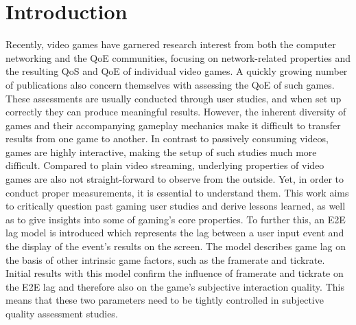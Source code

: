 \section{Introduction}
\label{sec:introduction}

Recently, video games have garnered research interest from both the computer networking and the \gls{QoE} communities, focusing on network-related properties and the resulting \gls{QoS} and \gls{QoE} of individual video games. 
A quickly growing number of publications also concern themselves with assessing the \gls{QoE} of such games. These assessments are usually conducted through user studies, and when set up correctly they can produce meaningful results. However, the inherent diversity of games and their accompanying gameplay mechanics make it difficult to transfer results from one game to another. In contrast to passively consuming videos, games are highly interactive, making the setup of such studies much more difficult. Compared to plain video streaming, underlying properties of video games are also not straight-forward to observe from the outside. Yet, in order to conduct proper measurements, it is essential to understand them. This work aims to critically question past gaming user studies and derive lessons learned, as well as to give insights into some of gaming's core properties. To further this, an \gls{E2E} lag model is introduced which represents the lag between a user input event and the display of the event's results on the screen. The model describes game lag on the basis of other intrinsic game factors, such as the framerate and tickrate. Initial results with this model confirm the influence of framerate and tickrate on the \gls{E2E} lag and therefore also on the game's subjective interaction quality. This means that these two parameters need to be tightly controlled in subjective quality assessment studies.
